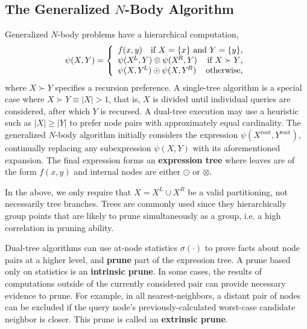 \documentclass[twoside,leqno,twocolumn]{article}
\newcommand{\union}{\cup}
\newcommand{\prefsplit}[2]{#1 \succ #2}
\newcommand{\gnp}{\psi}
\newcommand{\mysub}[1]{\subsection{#1} }
\newcommand{\defterm}[1]{{\bf #1}}
\newcommand{\kdroot}[1]{#1^{\text{root}}}
\newcommand{\kdleft}[1]{#1^{\!L}}
\newcommand{\kdright}[1]{#1^{\!R}}
\newcommand{\outstat}{\sigma}
\begin{document}
\mysub{The Generalized $N$-Body Algorithm}
Generalized $N$-body problems have a hierarchical computation,
\[
\gnp(X,Y) = \left\{ \begin{array}{lrr}
    f(x,y) & \multicolumn{2}{r}{\text{if }X = \{x\}\text{ and }Y = \{y\}\text{,}}
    \\
    \multicolumn{2}{l}{\gnp(\kdleft{X},Y) \otimes \gnp(\kdright{X}, Y)} & \text{if }\prefsplit{X}{Y}\text{,}
    \\
    \multicolumn{2}{l}{\gnp(X,\kdleft{Y}) \odot \gnp(X,\kdright{Y})} & \text{otherwise,}
  \end{array}
\right.
\]
\noindent
where $\prefsplit{X}{Y}$ specifies a recursion preference.
A single-tree algorithm is a special case where $\prefsplit{X}{Y} \equiv |X| > 1$, that is, $X$ is divided until individual queries are considered, after which $Y$ is recursed.
A dual-tree execution may use a heuristic such as $|X| \geq |Y|$ to prefer node pairs with approximately equal cardinality.
The generalized $N$-body algorithm initially considers the expression $\gnp(\kdroot{X}, \kdroot{Y})$, continually replacing any subexpression $\gnp(X, Y)$ with its aforementioned expansion.
The final expression forms an \defterm{expression tree} where leaves are of the form $f(x,y)$ and internal nodes are either $\odot$ or $\otimes$.

In the above, we only require that $X = \kdleft{X} \union \kdright{X}$ be a valid partitioning, not necessarily tree branches.
Trees are commonly used since they hierarchically group points that are likely to prune simultaneously as a group, i.e. a high correlation in pruning ability.

Dual-tree algorithms can use at-node statistics $\outstat(\cdot)$ to prove facts about node pairs at a higher level, and \defterm{prune} part of the expression tree.
A prune based only on statistics is an \defterm{intrinsic prune}.
In some cases, the results of computations outside of the currently considered pair can provide necessary evidence to prune.
For example, in all nearest-neighbors, a distant pair of nodes can be excluded if the query node's previously-calculated worst-case candidate neighbor is closer.
This prune is called an \defterm{extrinsic prune}.
\end{document}
